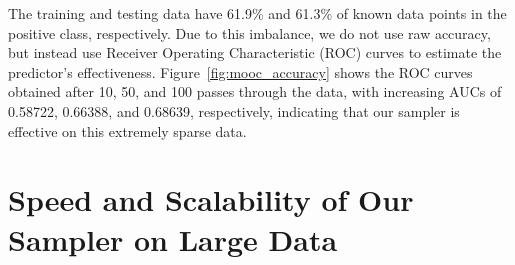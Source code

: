 \documentclass{article} %
\begin{document}
The training and testing data have 61.9\% and 61.3\% of known data points in the positive class,
respectively.  Due to this imbalance, we do not use raw accuracy, but instead use Receiver Operating
Characteristic (ROC) curves to estimate the predictor's effectiveness.
Figure~\ref{fig:mooc_accuracy} shows the ROC curves obtained after 10, 50, and 100 passes through
the data, with increasing AUCs of 0.58722, 0.66388, and 0.68639, respectively,  indicating that our
sampler is effective on this extremely sparse data.






\section{Speed and Scalability of Our Sampler on Large Data}\label{sec:scaling_large_data}
\end{document}
